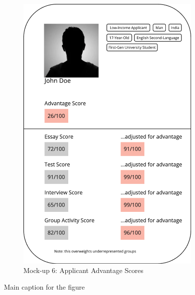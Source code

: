 \begin{figure}[htbp]
\begin{subfigure}[b]{0.3\textwidth}
        \includegraphics[width=\textwidth]{figures/codesign/advantage.png}
        \caption{Mock-up 6: Applicant Advantage Scores}
        \label{fig:advantage}
    \end{subfigure}
    \caption{Main caption for the figure}
    \label{fig:mockups}
\end{figure}